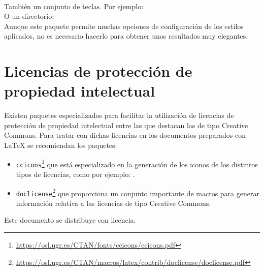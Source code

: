 \documentclass[11pt,a4paper]{article}
\begin{document}
\\

\noindent También un conjunto de teclas. Por ejemplo:
\\

\noindent O un directorio:
\\

\noindent Aunque este paquete permite muchas opciones de configuración de los estilos aplicados, no es necesario hacerlo para obtener unos resultados muy elegantes.


\section{Licencias de protección de propiedad intelectual}
Existen paquetes especializados para facilitar la utilización de licencias de protección de propiedad intelectual entre las que destacan las de tipo Creative Commons. Para tratar con dichas licencias en los documentos preparados con \LaTeX{} se recomiendan los paquetes:
\begin{itemize}
\item \texttt{ccicons}\footnote{\url{https://osl.ugr.es/CTAN/fonts/ccicons/ccicons.pdf}} que está especializado en la generación de los iconos de los distintos tipos de licencias, como por ejemplo: \ccbyncsa.

\item \texttt{doclicense}\footnote{\url{https://osl.ugr.es/CTAN/macros/latex/contrib/doclicense/doclicense.pdf}} que proporciona un conjunto importante de macros para generar información relativa a las licencias de tipo Creative Commons.
\end{itemize}

Este documento se distribuye con licencia:
\doclicenseThis
\end{document}

